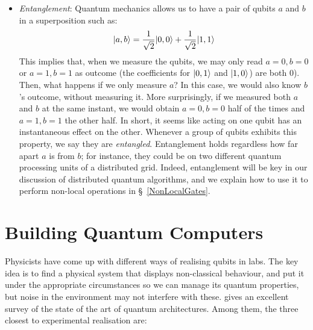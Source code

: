 \begin{itemize}
  \item \textit{Entanglement}: Quantum mechanics allows us to have a pair of qubits \(a\) and \(b\) in a superposition such as: \[\vert a,b \rangle = \frac{1}{\sqrt{2}}\vert 0,0 \rangle + \frac{1}{\sqrt{2}}\vert 1,1 \rangle\] This implies that, when we measure the qubits, we may only read \(a=0, b=0\) or \(a=1, b=1\) as outcome (the coefficients for \(\vert 0,1 \rangle\) and \(\vert 1,0 \rangle\)) are both \(0\)). Then, what happens if we only measure \(a\)? In this case, we would also know \(b\)'s outcome, without measuring it. More surprisingly, if we measured both \(a\) and \(b\) at the same instant, we would obtain \(a=0, b=0\) half of the times and \(a=1, b=1\) the other half. In short, it seems like acting on one qubit has an instantaneous effect on the other. Whenever a group of qubits exhibits this property, we say they are \textit{entangled}. Entanglement holds regardless how far apart \(a\) is from \(b\); for instance, they could be on two different quantum processing units of a distributed grid. Indeed, entanglement will be key in our discussion of distributed quantum algorithms, and we explain how to use it to perform non-local operations in \S~\ref{NonLocalGates}.

\end{itemize}


\section{Building Quantum Computers}
\label{Hardware}

Physicists have come up with different ways of realising qubits in labs. The key idea is to find a physical system that displays non-classical behaviour, and put it under the appropriate circumstances so we can manage its quantum properties, but noise in the environment may not interfere with these. \citet{ArchitectureSurvet} gives an excellent survey of the state of the art of quantum architectures. Among them, the three closest to experimental realisation are:

